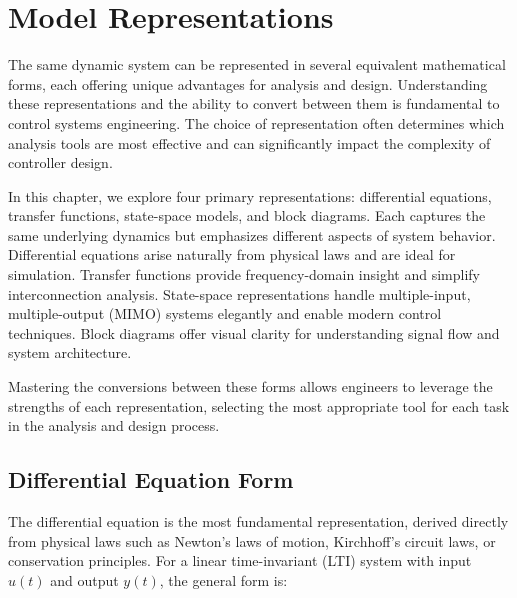 
\chapter{Model Representations}
\label{ch:model_representations}

The same dynamic system can be represented in several equivalent mathematical forms, each offering unique advantages for analysis and design. Understanding these representations and the ability to convert between them is fundamental to control systems engineering. The choice of representation often determines which analysis tools are most effective and can significantly impact the complexity of controller design.

In this chapter, we explore four primary representations: differential equations, transfer functions, state-space models, and block diagrams. Each captures the same underlying dynamics but emphasizes different aspects of system behavior. Differential equations arise naturally from physical laws and are ideal for simulation. Transfer functions provide frequency-domain insight and simplify interconnection analysis. State-space representations handle multiple-input, multiple-output (MIMO) systems elegantly and enable modern control techniques. Block diagrams offer visual clarity for understanding signal flow and system architecture.

Mastering the conversions between these forms allows engineers to leverage the strengths of each representation, selecting the most appropriate tool for each task in the analysis and design process.

\section{Differential Equation Form}
\label{sec:diff_eq_form}

The differential equation is the most fundamental representation, derived directly from physical laws such as Newton's laws of motion, Kirchhoff's circuit laws, or conservation principles. For a linear time-invariant (LTI) system with input $u(t)$ and output $y(t)$, the general form is:

